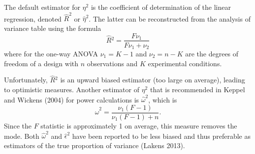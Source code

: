 \documentclass[
  11pt,
  letterpaper,
]{scrbook}
\theoremstyle{definition}
\theoremstyle{remark}
\begin{document}
The default estimator for \(\eta^2\) is the coefficient of determination
of the linear regression, denoted \(\widehat{R}^2\) or
\(\widehat{\eta}^2\). The latter can be reconstructed from the analysis
of variance table using the formula \[
\widehat{R}{}^2 = \frac{F\nu_1}{F\nu_1 + \nu_2}
\] where for the one-way ANOVA \(\nu_1 = K-1\) and \(\nu_2 = n-K\) are
the degrees of freedom of a design with \(n\) observations and \(K\)
experimental conditions.

Unfortunately, \(\widehat{R}{}^2\) is an upward biased estimator (too
large on average), leading to optimistic measures. Another estimator of
\(\eta^2\) that is recommended in Keppel and Wickens (2004) for power
calculations is \(\widehat{\omega}^2\), which is
\[\widehat{\omega}^2 = \frac{\nu_1 (F-1)}{\nu_1(F-1)+n}.\] Since the
\(F\) statistic is approximately 1 on average, this measure removes the
mode. Both \(\widehat{\omega}^2\) and \(\widehat{\epsilon}^2\) have been
reported to be less biased and thus preferable as estimators of the true
proportion of variance (Lakens 2013).
\end{document}
